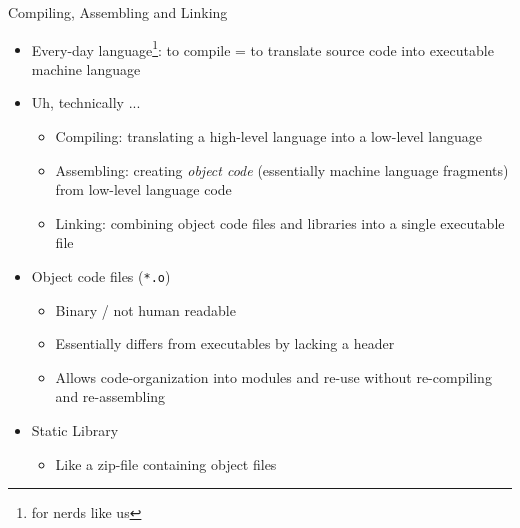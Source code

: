 \begin{frame}{Compiling, Assembling and Linking}
%
\begin{itemize}
\item Every-day language\footnote{for nerds like us}: to compile = to translate source code into executable machine language
\item Uh, technically ...
	\begin{itemize}
	\item Compiling: translating a high-level language into a low-level language
	\item Assembling: creating \emph{object code} (essentially machine language fragments) from low-level language code
	\item Linking: combining object code files and libraries into a single executable file
	\end{itemize}
\item Object code files (\texttt{*.o})
	\begin{itemize}
	\item Binary / not human readable
	\item Essentially differs from executables by lacking a header
	\item Allows code-organization into modules and re-use without re-compiling and re-assembling
	\end{itemize}
\item Static Library
	\begin{itemize}
	\item Like a zip-file containing object files
	\end{itemize}
\end{itemize}
%
\end{frame}


